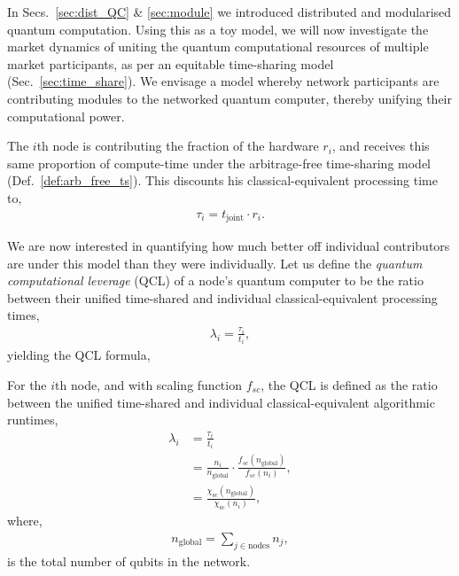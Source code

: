 In Secs.~\ref{sec:dist_QC} \& \ref{sec:module} we introduced distributed and modularised quantum computation. Using this as a toy model, we will now investigate the market dynamics of uniting the quantum computational resources of multiple market participants, as per an equitable time-sharing model (Sec.~\ref{sec:time_share}). We envisage a model whereby network participants are contributing modules to the networked quantum computer, thereby unifying their computational power.

The $i$th node is contributing the fraction of the hardware $r_i$, and receives this same proportion of compute-time under the arbitrage-free time-sharing model (Def.~\ref{def:arb_free_ts}). This discounts his classical-equivalent processing time to,
\begin{align}
\tau_i = t_\text{joint} \cdot r_i.
\end{align}

We are now interested in quantifying how much better off individual contributors are under this model than they were individually. Let us define the \textit{quantum computational leverage} (QCL) of a node's quantum computer to be the ratio between their unified time-shared and individual classical-equivalent processing times,
\begin{align}
\lambda_i = \frac{\tau_i}{t_i},
\end{align}
yielding the QCL formula,

\begin{definition} \label{def:quant_econ_lev}
For the $i$th node, and with scaling function $f_{sc}$, the QCL is defined as the ratio between the unified time-shared and individual classical-equivalent algorithmic runtimes,
\begin{align}
\lambda_i &= \frac{\tau_i}{t_i} \nonumber \\
&= \frac{n_i}{n_\text{global}} \cdot \frac{f_{sc}(n_\text{global})}{f_{sc}(n_i)}, \nonumber \\
&= \frac{\chi_\text{sc}(n_\text{global})}{\chi_\text{sc}(n_i)},
\end{align}
where,
\begin{align}
	n_\text{global} = \sum_{j\in \text{nodes}} n_j,
\end{align}
is the total number of qubits in the network.
\end{definition}

